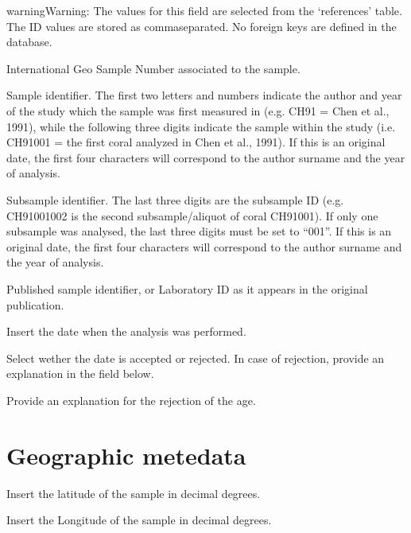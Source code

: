 \documentclass[letterpaper,10pt,english]{sphinxmanual}
\begin{document}
\begin{sphinxadmonition}{warning}{Warning:}
The values for this field are selected from the ‘references’ table. The ID values are stored as comma\sphinxhyphen{}separated. No foreign keys are defined in the database.
\end{sphinxadmonition}

 \sphinxhyphen{} International Geo Sample Number associated to the sample.

 \sphinxhyphen{} Sample identifier. The first two letters and numbers indicate the author and year of the study which the sample was first measured in (e.g. CH91 = Chen et al., 1991), while the following three digits indicate the sample within the study (i.e. CH91\sphinxhyphen{}001 = the first coral analyzed in Chen et al., 1991). If this is an original date, the first four characters will correspond to the author surname and the year of analysis.

 \sphinxhyphen{} Subsample identifier. The last three digits are the subsample ID (e.g. CH91\sphinxhyphen{}001\sphinxhyphen{}002 is the second subsample/aliquot of coral CH91\sphinxhyphen{}001). If only one subsample was analysed, the last three digits must be set to “001”. If this is an original date, the first four characters will correspond to the author surname and the year of analysis.

 \sphinxhyphen{} Published sample identifier, or Laboratory ID as it appears in the original publication.

 \sphinxhyphen{} Insert the date when the analysis was performed.

 \sphinxhyphen{} Select wether the date is accepted or rejected. In case of rejection, provide an explanation in the field below.

 \sphinxhyphen{} Provide an explanation for the rejection of the age.


\section{Geographic metedata}
\label{\detokenize{Dated_samples:geographic-metedata}}
 \sphinxhyphen{} Insert the latitude of the sample in decimal degrees.

 \sphinxhyphen{} Insert the Longitude of the sample in decimal degrees.
\end{document}
